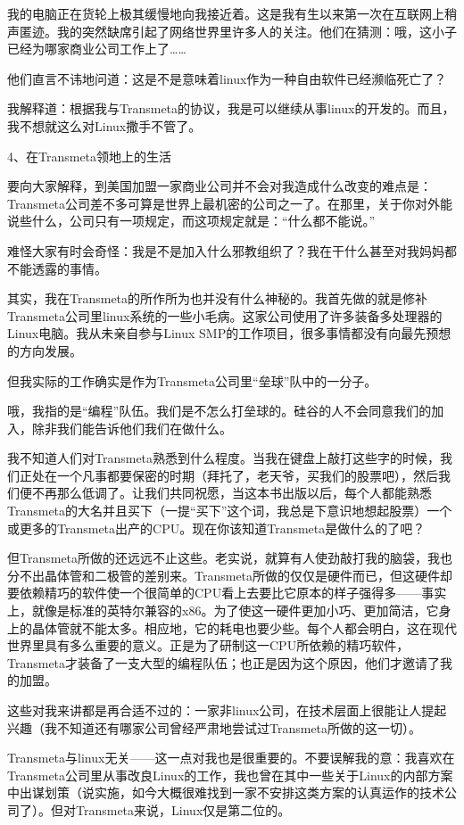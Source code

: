 我的电脑正在货轮上极其缓慢地向我接近着。这是我有生以来第一次在互联网上稍声匿迹。我的突然缺席引起了网络世界里许多人的关注。他们在猜测：哦，这小子已经为哪家商业公司工作上了……

他们直言不讳地问道：这是不是意味着linux作为一种自由软件已经濒临死亡了？

我解释道：根据我与Transmeta的协议，我是可以继续从事linux的开发的。而且，我不想就这么对Linux撒手不管了。

 
4、在Transmeta领地上的生活

要向大家解释，到美国加盟一家商业公司并不会对我造成什么改变的难点是：Transmeta公司差不多可算是世界上最机密的公司之一了。在那里，关于你对外能说些什么，公司只有一项规定，而这项规定就是：“什么都不能说。”

难怪大家有时会奇怪：我是不是加入什么邪教组织了？我在干什么甚至对我妈妈都不能透露的事情。

其实，我在Transmeta的所作所为也并没有什么神秘的。我首先做的就是修补Transmeta公司里linux系统的一些小毛病。这家公司使用了许多装备多处理器的Linux电脑。我从未亲自参与Linux SMP的工作项目，很多事情都没有向最先预想的方向发展。

但我实际的工作确实是作为Transmeta公司里“垒球”队中的一分子。

哦，我指的是“编程”队伍。我们是不怎么打垒球的。硅谷的人不会同意我们的加入，除非我们能告诉他们我们在做什么。

我不知道人们对Transmeta熟悉到什么程度。当我在键盘上敲打这些字的时候，我们正处在一个凡事都要保密的时期（拜托了，老天爷，买我们的股票吧），然后我们便不再那么低调了。让我们共同祝愿，当这本书出版以后，每个人都能熟悉Transmeta的大名并且买下（一提“买下”这个词，我总是下意识地想起股票）一个或更多的Transmeta出产的CPU。现在你该知道Transmeta是做什么的了吧？

但Transmeta所做的还远远不止这些。老实说，就算有人使劲敲打我的脑袋，我也分不出晶体管和二极管的差别来。Transmeta所做的仅仅是硬件而已，但这硬件却要依赖精巧的软件使一个很简单的CPU看上去要比它原本的样子强得多——事实上，就像是标准的英特尔兼容的x86。为了使这一硬件更加小巧、更加简洁，它身上的晶体管就不能太多。相应地，它的耗电也要少些。每个人都会明白，这在现代世界里具有多么重要的意义。正是为了研制这一CPU所依赖的精巧软件，Transmeta才装备了一支大型的编程队伍；也正是因为这个原因，他们才邀请了我的加盟。

这些对我来讲都是再合适不过的：一家非linux公司，在技术层面上很能让人提起兴趣（我不知道还有哪家公司曾经严肃地尝试过Transmeta所做的这一切）。

Transmeta与linux无关——这一点对我也是很重要的。不要误解我的意：我喜欢在Transmeta公司里从事改良Linux的工作，我也曾在其中一些关于Linux的内部方案中出谋划策（说实施，如今大概很难找到一家不安排这类方案的认真运作的技术公司了）。但对Transmeta来说，Linux仅是第二位的。

